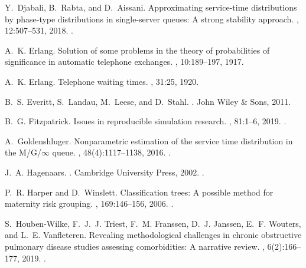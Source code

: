 \documentclass[11pt]{article}
\begin{document}
\begin{thebibliography}{10}
Y.~Djabali, B.~Rabta, and D.~Aissani.
\newblock Approximating service-time distributions by phase-type distributions
  in single-server queues: A strong stability approach.
,
  12:507--531, 2018.
\newblock \href {https://doi.org/10.1504/IJMOR.2018.10005095}
  {}.

A.~K. Erlang.
\newblock Solution of some problems in the theory of probabilities of
  significance in automatic telephone exchanges.
, 10:189--197, 1917.

A.~K. Erlang.
\newblock Telephone waiting times.
, 31:25, 1920.

B.~S. Everitt, S.~Landau, M.~Leese, and D.~Stahl.
.
\newblock John Wiley \& Sons, 2011.

B.~G. Fitzpatrick.
\newblock Issues in reproducible simulation research.
, 81:1--6, 2019.
\newblock \href {https://doi.org/10.1007/s11538-018-0496-1}
  {}.

A.~Goldenshluger.
\newblock Nonparametric estimation of the service time distribution in the
  {M/G/$\infty$} queue.
, 48(4):1117--1138, 2016.
\newblock \href {https://doi.org/10.1017/apr.2016.67}
  {}.

J.~A. Hagenaars.
.
\newblock Cambridge University Press, 2002.
\newblock \href {https://doi.org/10.1017/CBO9780511499531}
  {}.

P.~R. Harper and D.~Winslett.
\newblock Classification trees: A possible method for maternity risk grouping.
, 169:146--156, 2006.
\newblock \href {https://doi.org/10.1016/j.ejor.2004.05.014}
  {}.

S.~Houben-Wilke, F.~J.~J. Triest, F.~M. Franssen, D.~J. Janssen, E.~F. Wouters,
  and L.~E. Vanfleteren.
\newblock Revealing methodological challenges in chronic obstructive pulmonary
  disease studies assessing comorbidities: A narrative review.
, 6(2):166--177, 2019.
\newblock \href {https://doi.org/10.15326/jcopdf.6.2.2018.0145}
  {}.


\end{thebibliography}
\end{document}
